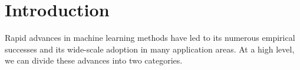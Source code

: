 \chapter{Introduction}
\label{chapt:introduction}









Rapid advances in machine learning methods have led to its numerous empirical successes and its wide-scale adoption in many application areas.
At a high level, we can divide these advances into two categories.

